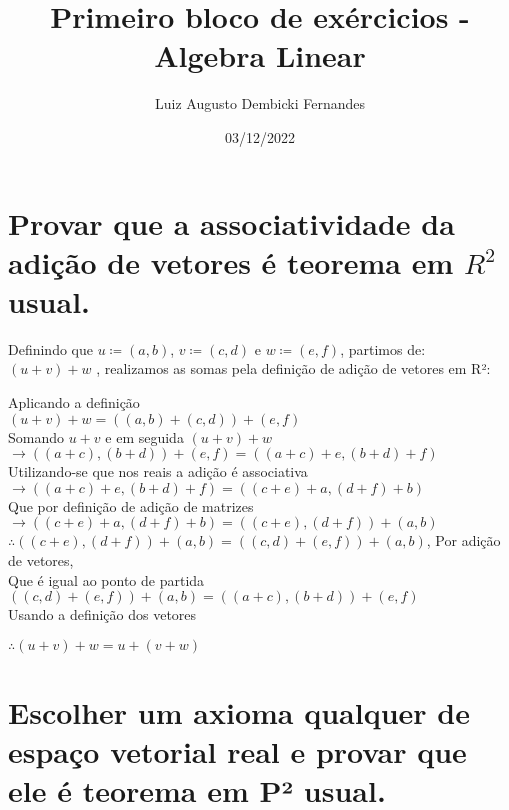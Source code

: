\documentclass[12pt, twoside, a4]{article} %
\begin{document}
\title{Primeiro bloco de exércicios - Algebra Linear}
\author{Luiz Augusto Dembicki Fernandes}
\date{03/12/2022}
\maketitle

\section{Provar que a associatividade da adição de vetores é teorema em $ R^2 $ usual.}

\quad    Definindo que $ u \coloneqq (a, b)$, $v  \coloneqq  (c, d)$ e $w  \coloneqq  (e, f)$, partimos de:
$ (u + v) + w $ , realizamos as somas pela definição de adição de vetores em R²:
\begin{center}
\begin{doublespacing}
    
Aplicando a definição \\ 
$ (u + v) + w = ((a, b) + (c, d)) + (e, f)$ \\
Somando $u + v$ e em seguida $ (u + v) + w$ \\
$ \to ((a + c), (b + d)) + (e, f) =  ((a + c) + e, (b + d) + f)$ \\
Utilizando-se que nos reais a adição é associativa \\
$ \to ((a + c) + e, (b + d) + f) = ((c + e) + a, (d + f) + b)$ \\
Que por definição de adição de matrizes \\
$ \to  ((c + e) + a, (d + f) + b) = ((c + e), (d + f)) + (a, b)$ \\
$ \therefore ((c + e), (d + f)) + (a, b) = ((c, d) + (e, f)) + (a, b)$, Por adição de vetores, \\
Que é igual ao ponto de partida \\
$ ((c, d) + (e, f)) + (a, b) =  ((a + c), (b + d)) + (e, f)$ \\
Usando a definição dos vetores \\
\end{doublespacing}
$ \therefore (u + v) + w = u + (v + w) $

\end{center}

\section{Escolher um axioma qualquer de espaço vetorial real e provar que ele é teorema em P² usual.}
\end{document}
